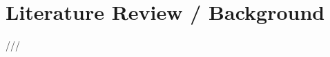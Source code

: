 \documentclass[12pt]{article}
\title{\vspace{-7cm}}
\author{}
\date{}
\begin{document}
\maketitle

\newcommand{\HRule}{\rule{\linewidth}{0.5mm}} %

\section{Literature Review / Background}

///

\clearpage
\end{document}
